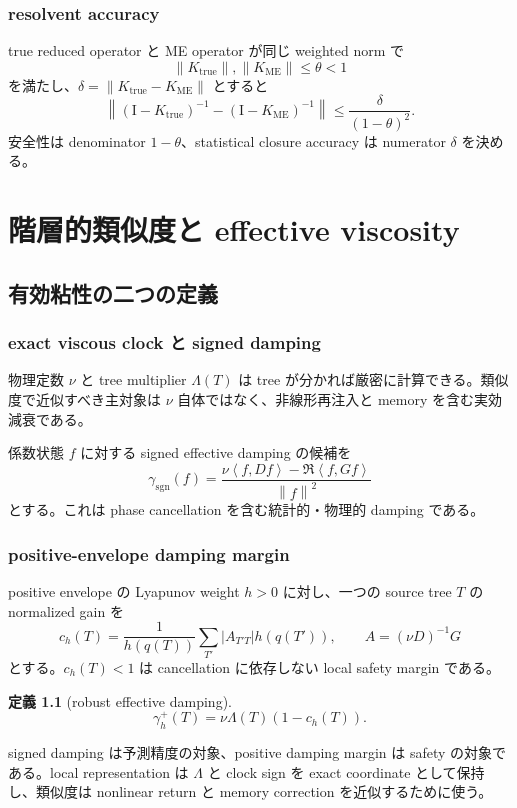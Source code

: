 \documentclass[11pt,a4paper,openany]{book}
\newtheorem{definition}{定義}[chapter]
\numberwithin{equation}{chapter}
\newcommand{\Id}{\mathrm I}
\newcommand{\norm}[1]{\left\lVert #1\right\rVert}
\newcommand{\ip}[2]{\left\langle #1,#2\right\rangle}
\begin{document}
\section{resolvent accuracy}
true reduced operator と ME operator が同じ weighted norm で
\[
\norm{K_{\mathrm{true}}},\norm{K_{\mathrm{ME}}}\le\theta<1
\]
を満たし、$\delta=\norm{K_{\mathrm{true}}-K_{\mathrm{ME}}}$ とすると
\[
\norm{(\Id-K_{\mathrm{true}})^{-1}
-(\Id-K_{\mathrm{ME}})^{-1}}
\le
\frac{\delta}{(1-\theta)^2}.
\]
安全性は denominator $1-\theta$、statistical closure accuracy は numerator $\delta$ を決める。

\part{階層的類似度と effective viscosity}

\chapter{有効粘性の二つの定義}
\section{exact viscous clock と signed damping}
物理定数 $\nu$ と tree multiplier $\Lambda(T)$ は tree が分かれば厳密に計算できる。類似度で近似すべき主対象は $\nu$ 自体ではなく、非線形再注入と memory を含む実効減衰である。

係数状態 $f$ に対する signed effective damping の候補を
\[
\gamma_{\mathrm{sgn}}(f)
=\frac{\nu\ip{f}{Df}-\Re\ip{f}{Gf}}{\norm f^2}
\]
とする。これは phase cancellation を含む統計的・物理的 damping である。

\section{positive-envelope damping margin}
positive envelope の Lyapunov weight $h>0$ に対し、一つの source tree $T$ の normalized gain を
\[
c_h(T)
=\frac1{h(q(T))}
\sum_{T'}|A_{T'T}|h(q(T')),
\qquad A=(\nu D)^{-1}G
\]
とする。$c_h(T)<1$ は cancellation に依存しない local safety margin である。

\begin{definition}[robust effective damping]
\[
\boxed{
\gamma_h^+(T)
=\nu\Lambda(T)(1-c_h(T)).}
\]
\end{definition}

signed damping は予測精度の対象、positive damping margin は safety の対象である。local representation は $\Lambda$ と clock sign を exact coordinate として保持し、類似度は nonlinear return と memory correction を近似するために使う。
\end{document}
